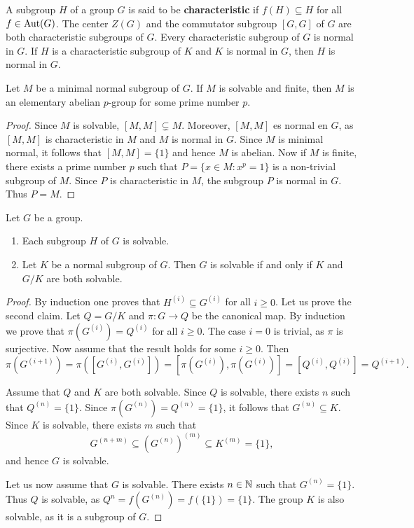 A subgroup $H$ of a group $G$ is said to be \textbf{characteristic} if 
$f(H)\subseteq H$ for all $f\in\operatorname{Aut}(G)$. 
The center $Z(G)$ and the commutator subgroup $[G,G]$ of $G$ are both 
characteristic subgroups of $G$. Every characteristic subgroup of $G$ is normal in $G$. 
If $H$ is a characteristic subgroup of $K$ and $K$ is normal in $G$, 
then $H$ is normal in $G$. 

\begin{lemma}
	\label{lem:minimal_normal}
	Let $M$ be a minimal normal subgroup of $G$. If $M$ is solvable and finite, then
	$M$ is an elementary abelian $p$-group for some prime number $p$. 
\end{lemma}

\begin{proof}
	Since $M$ is solvable, $[M,M]\subsetneq M$. Moreover, $[M,M]$ es normal en $G$, as 
    $[M,M]$ is characteristic in $M$ and $M$ is normal in $G$. Since $M$ is minimal normal, 
    it follows that $[M,M]=\{1\}$ and hence $M$ is abelian. 
	Now if $M$ is finite, there exists a prime number $p$ such that 
	$P=\{x\in M:x^p=1\}$ is a non-trivial subgroup of $M$.  
	Since $P$ is characteristic in $M$, the subgroup
	$P$ is normal in $G$. Thus $P=M$. 
\end{proof}

\begin{theorem}
	\label{theorem:resoluble}
	Let $G$ be a group. 
	\begin{enumerate}
		\item Each subgroup $H$ of $G$ is solvable. 
		\item Let $K$ be a normal subgroup of $G$. Then $G$ is solvable
			if and only if $K$ and $G/K$ are both solvable.
	\end{enumerate}
\end{theorem}

\begin{proof}
    By induction one proves that $H^{(i)}\subseteq G^{(i)}$ for all 
    $i\geq0$. Let us prove the second claim. Let $Q=G/K$ and $\pi\colon G\to Q$ be the canonical map. 
    By induction we prove that $\pi(G^{(i)})=Q^{(i)}$ for all 
	$i\geq0$. The case $i=0$ is trivial, as $\pi$ is surjective. Now assume that
	the result holds for some $i\geq0$. Then 
	\[
		\pi(G^{(i+1)})=\pi([G^{(i)},G^{(i)}])=[\pi(G^{(i)}),\pi(G^{(i)})]=[Q^{(i)},Q^{(i)}]=Q^{(i+1)}.
	\]

	Assume that $Q$ and $K$ are both solvable. Since $Q$ is solvable, 
	there exists $n$ such that $Q^{(n)}=\{1\}$.
	Since $\pi(G^{(n)})=Q^{(n)}=\{1\}$, it follows that $G^{(n)}\subseteq K$. Since $K$
	is solvable, there exists $m$ such that 
	\[
		G^{(n+m)}\subseteq (G^{(n)})^{(m)}\subseteq K^{(m)}=\{1\},
	\]
	and hence $G$ is solvable.  

	Let us now assume that $G$ is solvable. There exists $n\in\mathbb{N}$ such that $G^{(n)}=\{1\}$.
	Thus $Q$ is solvable, as $Q^{n}=f(G^{(n)})=f(\{1\})=\{1\}$. The group $K$ is also 
	solvable, as it is a subgroup of $G$. 
\end{proof}

